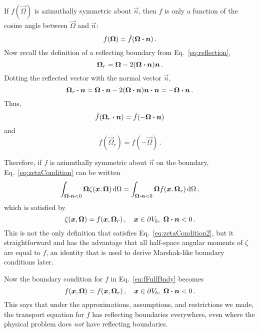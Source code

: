 If $f(\vec{\Omega})$ is azimuthally symmetric about $\vec{n}$, then $f$ is only
a function of the cosine angle between $\vec{\Omega}$ and $\vec{n}$:
\begin{equation*}
f(\bm{\Omega}) = \hat f( \bm{\Omega} \bm{\cdot} \bm{n})\,.
\end{equation*}
Now recall the definition of a reflecting boundary from
Eq.~\eqref{eq:reflection},
\begin{equation*}
  \bm{\Omega}_r = \bm{\Omega} - 2(\bm{\Omega} \bm{\cdot} \bm{n}) \bm{n}\,.
\end{equation*}
Dotting the reflected vector with the normal vector $\vec{n}$,
\begin{equation*}
  \bm{\Omega}_r \bm{\cdot} \bm{n}
  = \bm{\Omega} \bm{\cdot} \bm{n} - 2(\bm{\Omega} \bm{\cdot} \bm{n}) \bm{n}\bm{\cdot} \bm{n}
  = - \bm{\Omega} \bm{\cdot} \bm{n}\,.
\end{equation*}
Thus,
\begin{equation*}
  \hat f( \bm{\Omega}_r \bm{\cdot} \bm{n}) = \hat f( -\bm{\Omega} \bm{\cdot} \bm{n})
\end{equation*}
and
\begin{equation}\label{eq:aziSymResult}
  f( \vec{\Omega}_r) = f( -\vec{\Omega} )\,.
\end{equation}

Therefore, if $f$ is azimuthally symmetric about $\vec{n}$ on the
boundary, Eq.~\eqref{eq:zetaCondition} can be written
\begin{equation}\label{eq:zetaCondition2}
  \int_{\bm{\Omega} \bm{\cdot} \bm{n} < 0}
  \bm{\Omega} \zeta(\bm{x}, \bm{\Omega})\mathop{}\!\mathrm{d}\Omega
  = \int_{\bm{\Omega} \bm{\cdot} \bm{n} < 0}
  \bm{\Omega} f(\bm{x}, \bm{\Omega}_r)\mathop{}\!\mathrm{d}\Omega \,,
\end{equation}
which is satisfied by
\begin{equation} \label{eq:zeta}
  \zeta(\bm{x}, \bm{\Omega}) = f(\bm{x}, \bm{\Omega}_r) \,,
 \quad \bm{x} \in \partial V_b, \ \bm{\Omega} \bm{\cdot} \bm{n} < 0 \,.
\end{equation}
This is not the only definition that satisfies Eq.~\eqref{eq:zetaCondition2},
but it straightforward and has the advantage that all half-space angular moments
of $\zeta$ are equal to $f$, an identity that is used to derive Marshak-like
boundary conditions later.

Now the boundary condition for $f$ in Eq.~\eqref{eq:fFullBndy} becomes
\begin{equation} \label{eq:fFullBndy2}
  f(\bm{x}, \bm{\Omega}) = f(\bm{x}, \bm{\Omega}_r) \,,
 \quad \bm{x} \in \partial V_b, \ \bm{\Omega} \bm{\cdot} \bm{n} < 0\,.
\end{equation}
This says that under the approximations, assumptions, and restrictions we made,
the transport equation for $f$ has reflecting boundaries everywhere, even
where the physical problem does \emph{not} have reflecting boundaries.

